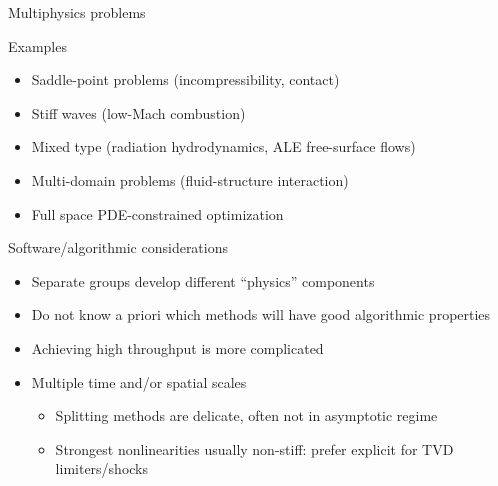 \begin{frame}{Multiphysics problems}
  \begin{block}{Examples}
    \begin{itemize}
    \item Saddle-point problems (\eg incompressibility, contact)
    \item Stiff waves (\eg low-Mach combustion)
    \item Mixed type (\eg radiation hydrodynamics, ALE free-surface flows)
    \item Multi-domain problems (\eg fluid-structure interaction)
    \item Full space PDE-constrained optimization
    \end{itemize}
  \end{block}
  \begin{block}{Software/algorithmic considerations}
    \begin{itemize}
    \item Separate groups develop different ``physics'' components
    \item Do not know a priori which methods will have good algorithmic properties
    \item Achieving high throughput is more complicated
    \item Multiple time and/or spatial scales
      \begin{itemize}
      \item Splitting methods are delicate, often not in asymptotic regime
      \item Strongest nonlinearities usually non-stiff: prefer explicit for TVD limiters/shocks
      \end{itemize}
    \end{itemize}
  \end{block}
\end{frame}
